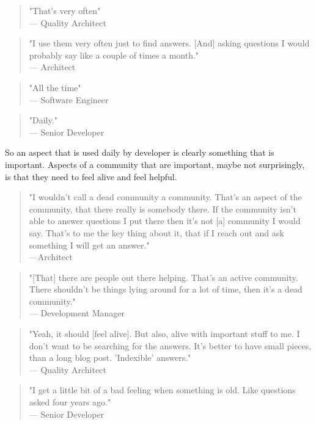 \documentclass{cslthse-msc}
\begin{document}
    \begin{quote}
        "That's very often"\\ --- Quality Architect
    \end{quote}
    \begin{quote}
        "I use them very often just to find answers. [And] asking questions I would probably say like a couple of times a month."\\
        --- Architect
    \end{quote}
    \begin{quote}
        "All the time" \\
        --- Software Engineer
    \end{quote}
    \begin{quote}
        "Daily."\\
        --- Senior Developer
    \end{quote}
    So an aspect that is used daily by developer is clearly something that is important. Aspects of a community that are important, maybe not surprisingly, is that they need to feel alive and feel helpful.
    \begin{quote}
        "I wouldn't call a dead community a community. That's an aspect of the community, that there really is somebody there. If the community isn't able to answer questions I put there then it's not [a] community I would say. That's to me the key thing about it, that if I reach out and ask something I will get an answer."\\---Architect
    \end{quote}
    \begin{quote}
        "[That] there are people out there helping. That's an active community. There shouldn't be things lying around for a lot of time, then it's a dead community."\\--- Development Manager
    \end{quote}
    \begin{quote}
        "Yeah, it should [feel alive]. But also, alive with important stuff to me. I don't want to be searching for the answers. It's better to have small pieces, than a long blog post. 'Indexible' answers."\\--- Quality Architect
    \end{quote}
    \begin{quote}
        "I get a little bit of a bad feeling when something is old. Like questions asked four years ago." \\--- Senior Developer
    \end{quote}
\end{document}

